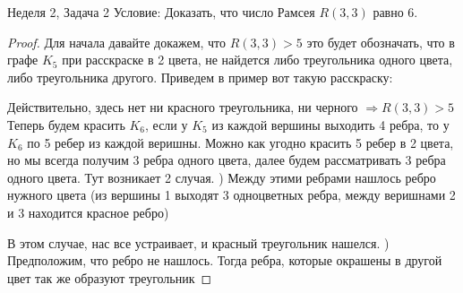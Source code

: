 \documentclass[a4paper,12pt]{article}
\numberwithin{equation}{section}
\theoremstyle{plain}
\theoremstyle{definition}
\theoremstyle{remark}
\begin{document}
Неделя 2, Задача 2 \newline
Условие:
Доказать, что число Рамсея $R(3,3)$ равно 6.
\begin{proof} \newline
Для начала давайте докажем, что $R(3,3) > 5$ это будет обозначать, что в графе $K_5$ при расскраске в 2 цвета, не найдется либо треугольника одного цвета, либо треугольника другого. Приведем в пример вот такую расскраску:


 \newline

Действительно, здесь нет ни красного треугольника, ни черного $\Rightarrow R(3,3) > 5$ \newline
Теперь будем красить $K_6$, если у $K_5$ из каждой вершины выходить 4 ребра, то у $K_6$ по 5 ребер из каждой веришны. Можно как угодно красить 5 ребер в 2 цвета, но мы всегда получим 3 ребра одного цвета, далее будем рассматривать 3 ребра одного цвета.
Тут возникает 2 случая. \newlline
{}) Между этими ребрами нашлось ребро нужного цвета (из вершины 1 выходят 3 одноцветных ребра, между веришнами 2 и 3 находится красное ребро)

 \newline

В этом случае, нас все устраивает, и красный треугольник нашелся.  ) Предположим, что ребро не нашлось. Тогда ребра, которые окрашены в другой цвет так же образуют треугольник \newline


\end{proof}
\end{document}
